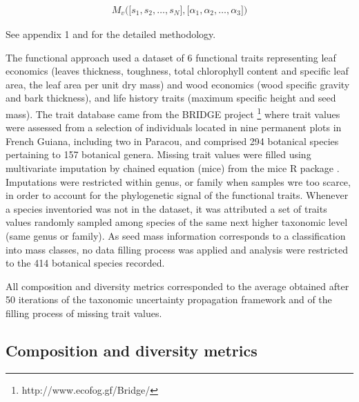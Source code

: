 \documentclass[fleqn,10pt]{ArtEcoFoG} %
\theoremstyle{definition}
\theoremstyle{definition}
\theoremstyle{definition}
\theoremstyle{remark}
\begin{document}
\begin{align}
M_v\Big(\big[s_1, s_2, …, s_N\big],\big[\alpha_1, \alpha_2,…, \alpha_3\big]\Big) \nonumber
\end{align}

See appendix 1 and \citet{Aubry-Kientz2013} for the detailed
methodology.

The functional approach used a dataset of 6 functional traits
representing leaf economics (leaves thickness, toughness, total
chlorophyll content and specific leaf area, the leaf area per unit dry
mass) and wood economics (wood specific gravity and bark thickness), and
life history traits (maximum specific height and seed mass). The trait
database came from the BRIDGE project \footnote{http://www.ecofog.gf/Bridge/}
where trait values were assessed from a selection of individuals located
in nine permanent plots in French Guiana, including two in Paracou, and
comprised 294 botanical species pertaining to 157 botanical genera.
Missing trait values were filled using multivariate imputation by
chained equation (mice) from the mice R package \citep{Mice2011}.
Imputations were restricted within genus, or family when samples wre too
scarce, in order to account for the phylogenetic signal of the
functional traits. Whenever a species inventoried was not in the
dataset, it was attributed a set of traits values randomly sampled among
species of the same next higher taxonomic level (same genus or family).
As seed mass information corresponds to a classification into mass
classes, no data filling process was applied and analysis were
restricted to the 414 botanical species recorded.

All composition and diversity metrics corresponded to the average
obtained after 50 iterations of the taxonomic uncertainty propagation
framework and of the filling process of missing trait values.

\subsection{Composition and diversity
metrics}\label{composition-and-diversity-metrics}
\end{document}
